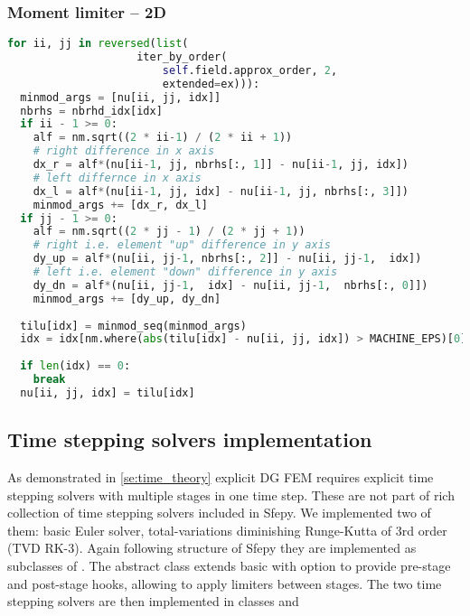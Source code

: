 \subsubsection{Moment limiter -- 2D}
\label{se:i_moment_lim_2D}
\setcounter{lstannotation}{0}
\begin{lstlisting}[language=Python, caption=Moment limiter for 
cartesian grid]
for ii, jj in reversed(list(
					iter_by_order(
						self.field.approx_order, 2,
						extended=ex))):
  minmod_args = [nu[ii, jj, idx]]
  nbrhs = nbrhd_idx[idx]
  if ii - 1 >= 0:
  	alf = nm.sqrt((2 * ii-1) / (2 * ii + 1))
  	# right difference in x axis
  	dx_r = alf*(nu[ii-1, jj, nbrhs[:, 1]] - nu[ii-1, jj, idx])
  	# left differnce in x axis
  	dx_l = alf*(nu[ii-1, jj, idx] - nu[ii-1, jj, nbrhs[:, 3]])
  	minmod_args += [dx_r, dx_l]
  if jj - 1 >= 0:
  	alf = nm.sqrt((2 * jj - 1) / (2 * jj + 1))
  	# right i.e. element "up" difference in y axis
  	dy_up = alf*(nu[ii, jj-1, nbrhs[:, 2]] - nu[ii, jj-1,  idx])
  	# left i.e. element "down" difference in y axis
  	dy_dn = alf*(nu[ii, jj-1,  idx] - nu[ii, jj-1,  nbrhs[:, 0]])
  	minmod_args += [dy_up, dy_dn]
  	
  tilu[idx] = minmod_seq(minmod_args)
  idx = idx[nm.where(abs(tilu[idx] - nu[ii, jj, idx]) > MACHINE_EPS)[0]]
  
  if len(idx) == 0:
  	break
  nu[ii, jj, idx] = tilu[idx]
\end{lstlisting}


\subsection{Time stepping solvers implementation}
As demonstrated in \ref{se:time_theory} explicit DG FEM requires explicit time 
stepping solvers with multiple stages in one time step. These are not part of 
rich collection of time stepping solvers included in Sfepy. We implemented 
two of them: basic Euler solver, total-variations diminishing Runge-Kutta 
of 3rd order (TVD RK-3). 
Again following 
structure of Sfepy they are implemented as subclasses of 
. The abstract class  
extends basic  with option to provide pre-stage and 
post-stage hooks, allowing to apply limiters between stages. The two time stepping 
solvers are then implemented in classes  and 

